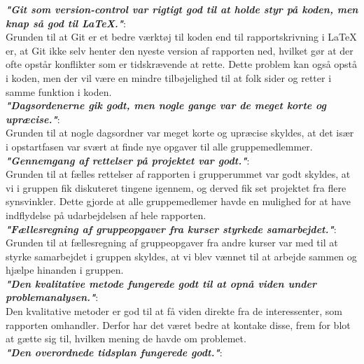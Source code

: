 \documentclass[oneside,a4paper,titlepage]{article}
\begin{document}
\textbf{\textit{"Git som version-control var rigtigt god til at holde styr på koden, men knap så god til LaTeX."}}: \\

Grunden til at Git er et bedre værktøj til koden end til rapportskrivning i LaTeX er, at Git ikke selv henter den nyeste version af rapporten ned, hvilket gør at der ofte opstår konflikter som er tidskrævende at rette. Dette problem kan også opstå i koden, men der vil være en mindre tilbøjelighed til at folk sider og retter i samme funktion i koden.  \\

\textbf{\textit{"Dagsordenerne gik godt, men nogle gange var de meget korte og upræcise."}}: \\

Grunden til at nogle dagsordner var meget korte og upræcise skyldes, at det især i opstartfasen var svært at finde nye opgaver til alle gruppemedlemmer. \\

\textbf{\textit{"Gennemgang af rettelser på projektet var godt."}}: \\

Grunden til at fælles rettelser af rapporten i grupperummet var godt skyldes, at vi i gruppen fik diskuteret tingene igennem, og derved fik set projektet fra flere synsvinkler. Dette gjorde at alle gruppemedlemer havde en mulighed for at have indflydelse på udarbejdelsen af hele rapporten.  \\

\textbf{\textit{"Fællesregning af gruppeopgaver fra kurser styrkede samarbejdet."}}: \\

Grunden til at fællesregning af gruppeopgaver fra andre kurser var med til at styrke samarbejdet i gruppen skyldes, at vi blev vænnet til at arbejde sammen og hjælpe hinanden i gruppen.  \\

\textbf{\textit{"Den kvalitative metode fungerede godt til at opnå viden under problemanalysen."}}: \\

Den kvalitative metoder er god til at få viden direkte fra de interessenter, som rapporten omhandler. Derfor har det været bedre at kontake disse, frem for blot at gætte sig til, hvilken mening de havde om problemet. \\

\textbf{\textit{"Den overordnede tidsplan fungerede godt."}}: \\
\end{document}
